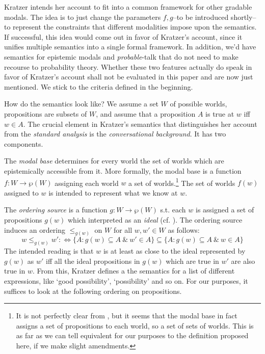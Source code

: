 \documentclass{article}
\theoremstyle{definition}
\newcommand\todo[1]{\textcolor{red}{#1}}
\begin{document}
Kratzer intends her account to fit into a common framework for other gradable modals.
The idea is to just change the parameters $f,g$--to be introduced shortly--to represent the constraints that different modalities impose upon the semantics.
If successful, this idea would come out in favor of Kratzer's account, since it unifies multiple semantics into a single formal framework.
In addition, we'd have semantics for epistemic modals and \emph{probable}-talk that do not need to make recourse to probability theory.
Whether these two features actually do speak in favor of Kratzer's account shall not be evaluated in this paper and are now just mentioned.
We stick to the criteria defined in the beginning.

How do the semantics look like?
We assume a set $W$ of possible worlds, propositions are subsets of $W$, and assume that a proposition $A$ is true at $w$ iff $w \in A$.
The crucial element in Kratzer's semantics that distinguishes her account from the \emph{standard analysis} is the \emph{conversational background}.
It has two components.

The \emph{modal base} determines for every world the set of worlds which are epistemically accessible from it.
More formally, the modal base is a function $f: W \rightarrow \wp(W)$ assigning each world $w$ a set of worlds.\footnote{It is not perfectly clear from \textcite[][p.~644]{kratzer91_modal}, but it seems that the modal base in fact assigns a set of propositions to each world, so a set of sets of worlds. This is as far as we can tell equivalent for our purposes to the definition proposed here, if we make slight amendments.}
The set of worlds $f(w)$ assigned to $w$ is intended to represent what we know at $w$.

The \emph{ordering source} is a function $g: W \rightarrow \wp(W)$ s.t. each $w$ is assigned a set of propositions $g(w)$ which interpreted as an \emph{ideal} (cf. \cite{lewis81_order_seman_premis_seman_count}). The ordering source induces an ordering $\leq_{g(w)}$ on $W$ for all $w,w' \in W$ as follows:
\begin{equation}
    \label{eq:porder}
w \leq_{g(w)} w' :\iff \{A: g(w) \subseteq A ~\&~ w' \in A\} \subseteq \{A: g(w) \subseteq A ~\&~ w \in A\}
\end{equation}
The intended reading is that $w$ is at least as close to the ideal represented by $g(w)$ as $w'$ iff all the ideal propositions in $g(w)$ which are true in $w'$ are also true in $w$.
From this, Kratzer defines a the semantics for a list of different expressions, like `good possibility', `possibility' and so on.
For our purposes, it suffices to look at the following ordering on propositions.
\end{document}
